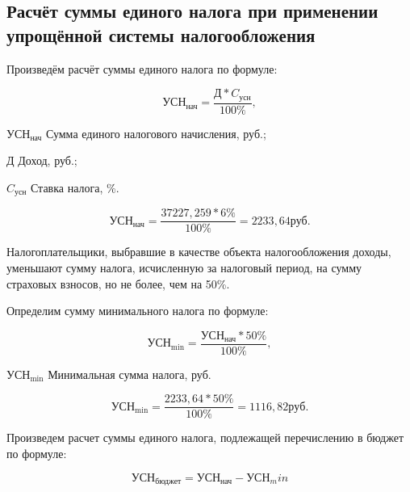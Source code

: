 \tocless\subsection{Расчёт суммы единого налога при применении упрощённой системы налогообложения}

Произведём расчёт суммы единого налога по формуле:

\begin{equation}
    \text{УСН}_\text{нач} = \frac{\text{Д} * C_\text{усн}}{100\%},
\end{equation}

\begin{eqexpl}[7ex]
    \item{$\text{УСН}_\text{нач}$} Сумма единого налогового начисления, руб.;
    \item{Д} Доход, руб.;
    \item{$C_\text{усн}$} Ставка налога, \%.
\end{eqexpl}

\begin{equation*}
    \text{УСН}_\text{нач} = \frac{37227,259 * 6\%}{100\%} = 2233,64 \text{руб}.
\end{equation*}

Налогоплательщики, выбравшие в качестве объекта налогообложения
доходы, уменьшают сумму налога, исчисленную за налоговый период, на
сумму страховых взносов, но не более, чем на 50\%.

Определим сумму минимального налога по формуле:

\begin{equation}
    \text{УСН}_\text{min} = \frac{\text{УСН}_\text{нач} * 50\%}{100\%},
\end{equation}

\begin{eqexpl}[7ex]
    \item{$\text{УСН}_\text{min}$} Минимальная сумма налога, руб.
\end{eqexpl}

\begin{equation*}
    \text{УСН}_\text{min} = \frac{2233,64 * 50\%}{100\%} = 1116,82 руб.
\end{equation*}

Произведем расчет суммы единого налога, подлежащей перечислению
в бюджет по формуле:

\begin{equation}
    \text{УСН}_\text{бюджет} = \text{УСН}_\text{нач} - \text{УСН}_min
\end{equation}

